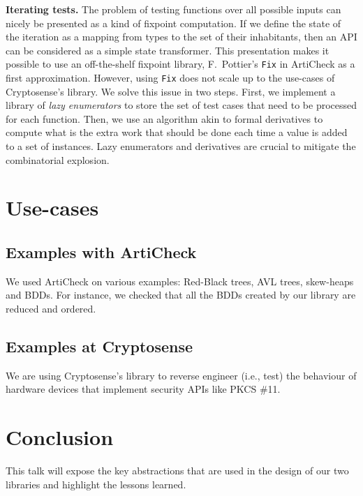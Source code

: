 \documentclass[twocolumn,9pt,a4paper]{easychair}
\newcommand{\acheck}{ArtiCheck\xspace}
\newcommand{\code}[1]{\texttt{#1}}
\renewcommand\paragraph[1]{\newline\textbf{#1}}
\begin{document}
\paragraph{Iterating tests.} The problem of testing functions over all
possible inputs can nicely be presented as a kind of fixpoint
computation. If we define the state of the iteration as a mapping from
types to the set of their inhabitants, then an API can be considered
as a simple state transformer.
%
This presentation makes it possible to use an off-the-shelf fixpoint
library, F.~Pottier's \code{Fix} in \acheck as a first
approximation.
%
However, using \code{Fix} does not scale up to the use-cases of
Cryptosense's library. We solve this issue in two steps. First, we
implement a library of \emph{lazy enumerators} to store the set of
test cases that need to be processed for each function. Then, we use
an algorithm akin to formal derivatives to compute what is the extra
work that should be done each time a value is added to a set of
instances. Lazy enumerators and derivatives are crucial to mitigate
the combinatorial explosion.

\section{Use-cases}
\subsection{Examples with \acheck}
We used \acheck on various examples: Red-Black trees, AVL trees,
skew-heaps and BDDs. For instance, we checked that all the BDDs
created by our library are reduced and ordered.
\subsection{Examples at Cryptosense}
We are using Cryptosense's library to reverse engineer (i.e., test)
the behaviour of hardware devices that implement security APIs like
PKCS \#11.

\section{Conclusion}
This talk will expose the key abstractions that are used in the design
of our two libraries and highlight the lessons learned.


% 
% 
\end{document}
